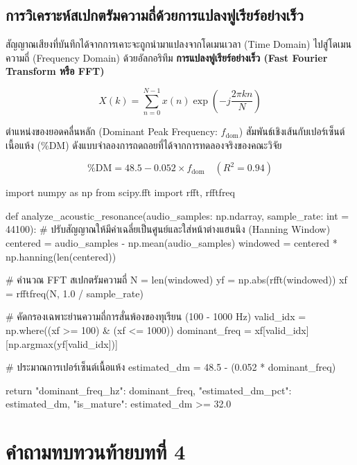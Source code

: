 \subsection{การวิเคราะห์สเปกตรัมความถี่ด้วยการแปลงฟูเรียร์อย่างเร็ว}

สัญญาณเสียงที่บันทึกได้จากการเคาะจะถูกนำมาแปลงจากโดเมนเวลา (Time Domain) ไปสู่โดเมนความถี่ (Frequency Domain) ด้วยอัลกอริทึม \textbf{การแปลงฟูเรียร์อย่างเร็ว (Fast Fourier Transform หรือ FFT)}

\begin{equation}
X(k) = \sum_{n=0}^{N-1} x(n) \exp\left( -j \frac{2\pi k n}{N} \right)
\label{eq:fft}
\end{equation}

ตำแหน่งของยอดคลื่นหลัก (Dominant Peak Frequency: $f_{\text{dom}}$) สัมพันธ์เชิงเส้นกับเปอร์เซ็นต์เนื้อแห้ง (\%DM) ดังแบบจำลองการถดถอยที่ได้จากการทดลองจริงของคณะวิจัย

\begin{equation}
\% \text{DM} = 48.5 - 0.052 \times f_{\text{dom}} \quad (R^2 = 0.94)
\label{eq:acoustic_dm}
\end{equation}

\begin{pythonbox}
import numpy as np
from scipy.fft import rfft, rfftfreq

def analyze_acoustic_resonance(audio_samples: np.ndarray, sample_rate: int = 44100):
    # ปรับสัญญาณให้มีค่าเฉลี่ยเป็นศูนย์และใส่หน้าต่างแฮนนิง (Hanning Window)
    centered = audio_samples - np.mean(audio_samples)
    windowed = centered * np.hanning(len(centered))
    
    # คำนวณ FFT สเปกตรัมความถี่
    N = len(windowed)
    yf = np.abs(rfft(windowed))
    xf = rfftfreq(N, 1.0 / sample_rate)
    
    # คัดกรองเฉพาะย่านความถี่การสั่นพ้องของทุเรียน (100 - 1000 Hz)
    valid_idx = np.where((xf >= 100) & (xf <= 1000))
    dominant_freq = xf[valid_idx][np.argmax(yf[valid_idx])]
    
    # ประมาณการเปอร์เซ็นต์เนื้อแห้ง
    estimated_dm = 48.5 - (0.052 * dominant_freq)
    
    return {
        "dominant_freq_hz": dominant_freq,
        "estimated_dm_pct": estimated_dm,
        "is_mature": estimated_dm >= 32.0
    }
\end{pythonbox}

\section*{คำถามทบทวนท้ายบทที่ 4}

